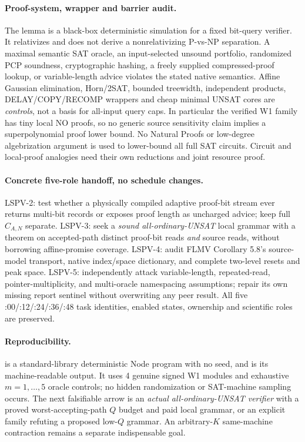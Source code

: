 \documentclass[11pt]{article}
\begin{document}
\paragraph{Proof-system, wrapper and barrier audit.}
The lemma is a black-box deterministic simulation
for a fixed bit-query verifier. It relativizes and
does not derive a nonrelativizing P-vs-NP separation.
A maximal semantic SAT oracle, an input-selected
unsound portfolio, randomized PCP soundness,
cryptographic hashing, a freely supplied
compressed-proof lookup, or variable-length
advice violates the stated native semantics.
Affine Gaussian elimination, Horn/2SAT,
bounded treewidth, independent products,
DELAY/COPY/RECOMP wrappers and cheap minimal
UNSAT cores are \emph{controls}, not a basis for
all-input query caps. In particular the
verified W1 family has tiny local NO proofs,
so no generic source sensitivity claim
implies a superpolynomial proof lower bound.
No Natural Proofs or low-degree algebrization
argument is used to lower-bound all full SAT
circuits. Circuit and local-proof analogies need
their own reductions and joint resource proof.

\paragraph{Concrete five-role handoff, no schedule changes.}
LSPV-2: test whether a physically compiled
adaptive proof-bit stream ever returns multi-bit
records or exposes proof length as uncharged
advice; keep full $C_{A,N}$ separate.
LSPV-3: seek a \emph{sound all-ordinary-UNSAT}
local grammar with a theorem on accepted-path
distinct proof-bit reads \emph{and} source reads,
without borrowing affine-promise coverage.
LSPV-4: audit FLMV Corollary 5.8's source-model
transport, native index/space dictionary,
and complete two-level resets and peak space.
LSPV-5: independently attack variable-length,
repeated-read, pointer-multiplicity, and
multi-oracle namespacing assumptions;
repair its own missing report sentinel
without overwriting any peer result.
All five :00/:12/:24/:36/:48 task identities,
enabled states, ownership and scientific roles
are preserved.

\paragraph{Reproducibility.}
is a standard-library deterministic Node program
with no seed, and
is its machine-readable output. It uses 4
genuine signed W1 modules and exhaustive
$m=1,\ldots,5$ oracle controls; no hidden
randomization or SAT-machine sampling occurs.
The next falsifiable arrow is an
\emph{actual all-ordinary-UNSAT verifier}
with a proved worst-accepting-path $Q$ budget
and paid local grammar, or an explicit
family refuting a proposed low-$Q$ grammar.
An arbitrary-$K$ same-machine contraction
remains a separate indispensable goal.
\end{document}
